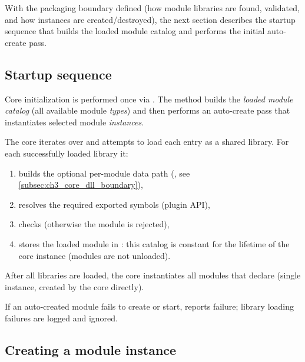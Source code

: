 With the packaging boundary defined (how module libraries are found, validated, and how instances are created/destroyed), the next section describes the startup sequence that builds the loaded module catalog and performs the initial auto-create pass.




\subsection{Startup sequence} \label{subsec:ch3_core_startup}

Core initialization is performed once via . The method builds the \emph{loaded module catalog} (all available module \emph{types}) and then performs an auto-create pass that instantiates selected module \emph{instances}.

The core iterates over  and attempts to load each entry as a shared library. For each successfully loaded library it:
\begin{enumerate}
    \item builds the optional per-module data path (, see \autoref{subsec:ch3_core_dll_boundary}),
    \item resolves the required exported symbols (plugin API),
    \item checks  (otherwise the module is rejected),
    \item stores the loaded module in : this catalog is constant for the lifetime of the core instance (modules are not unloaded).
\end{enumerate}

After all libraries are loaded, the core instantiates all modules that declare  (single instance, created by the core directly).

If an auto-created module fails to create or start,  reports failure; library loading failures are logged and ignored.



\subsection{Creating a module instance} \label{subsec:ch3_core_create_instance}

